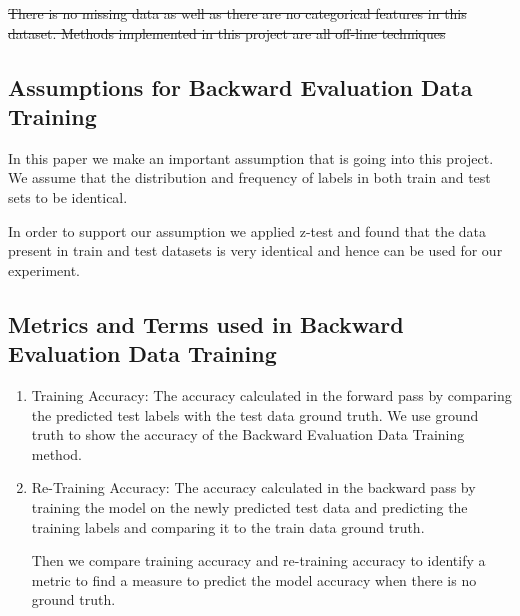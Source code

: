 \documentclass[a4paper,conference]{IEEEtran}
\begin{document}
\sout{There is no missing data as well as there are no categorical features in this dataset. Methods implemented in this project are all off-line techniques}

\subsection{Assumptions for Backward Evaluation Data Training}
In this paper we make an important assumption that is going into this project. We assume that the distribution and frequency of labels in both train and test sets to be identical.

In order to support our assumption we applied z-test and found that the data present in train and test datasets is very identical and hence can be used for our experiment.


\subsection{Metrics and Terms used in Backward Evaluation Data Training}
\begin{enumerate}
\item Training Accuracy: The accuracy calculated in the forward pass by comparing the predicted test labels with the test data ground truth. We use ground truth to show the accuracy of the Backward Evaluation Data Training method.
\item Re-Training Accuracy: The accuracy calculated in the backward pass by training the model on the newly predicted test data and predicting the training labels and comparing it to the train data ground truth.

Then we compare training accuracy and re-training accuracy to identify a metric to find a measure to predict the model accuracy when there is no ground truth.
\end{enumerate}
\end{document}
